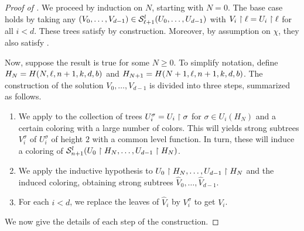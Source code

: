 \begin{proof}[Proof of ]
  We proceed by induction on $N$, starting with $N=0$. The base case holds by taking any $(V_0,\dots, V_{d-1}) \in\mathcal{S}^{l}_{\ell+1}({U_0,\dots,U_{d-1}})$ with $V_i \upharpoonright \ell = U_i \upharpoonright \ell$ for all $i < d$.
  These trees satisfy  by construction. Moreover, by assumption on $\chi$, they also satisfy .





  Now, suppose the result is true for some $N\geq 0$.
  To simplify notation, define $H_{N}=H(N,\ell,n+1,k,d, b)$ and $H_{N+1}=H(N+1,\ell,n+1,k,d, b)$. The construction of the solution $V_0,\dots, V_{d-1}$ is divided into three steps, summarized as follows.
  \begin{enumerate}
  \item We apply  to the collection of trees $U_i^\sigma = U_i \upharpoonright \sigma$ for $\sigma \in U_i(H_N)$
  and a certain coloring with a large number of colors. This will yields strong subtrees $V_i^\sigma$ of $U_i^\sigma$ of height $2$ with a common level function. In turn, these will induce a coloring of $\mathcal{S}^{l}_{n+1}({U_0\upharpoonright H_N,\dots, U_{d-1}\upharpoonright H_N})$.
  \item We apply the inductive hypothesis to $U_0\upharpoonright H_N,\dots, U_{d-1}\upharpoonright H_N$ and the induced coloring, obtaining strong subtrees $\hat V_0,\dots, \hat V_{d-1}$.
  \item For each $i < d$, we replace the leaves of $\hat V_i$ by $V_i^\sigma$ to get $V_i$.
  \end{enumerate}
  We now give the details of each step of the construction.
  

\end{proof}
